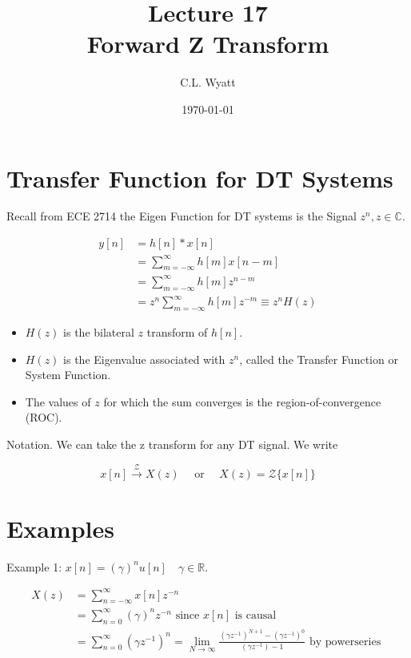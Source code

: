 \documentclass{article}
\begin{document}
\title{Lecture 17\\Forward Z Transform}
\author{C.L. Wyatt}
\date{\today}
\maketitle

\section{Transfer Function for DT Systems}

Recall from ECE 2714 the Eigen Function for DT systems is the Signal $z^{n}, z \in \mathbb{C}$.

$$
\begin{aligned}
y[n] &= h[n] * x[n]\\
& =\sum_{m=-\infty}^{\infty} h[m] x[n-m] \\
& =\sum_{m=-\infty}^{\infty} h[m] z^{n-m} \\
& =z^{n} \sum_{m=-\infty}^{\infty} h[m] z^{-m} \equiv z^{n} H(z)
\end{aligned}
$$

\begin{itemize}
  \item $H(z)$ is the bilateral $z$ transform of $h[n]$.
  \item $H(z)$ is the Eigenvalue associated with $z^{n}$, called the Transfer Function or System Function.
  \item The values of $z$ for which the sum converges is the region-of-convergence (ROC). 
\end{itemize}


Notation. We can take the z transform for any DT signal. We write

$$
x[n] \stackrel{\mathcal{Z}}{\longrightarrow} X(z) \quad\text{ or }\quad  X(z)=\mathcal{Z}\{x[n]\}
$$

\section{Examples}

Example 1: $x[n]=(\gamma)^{n} u[n] \quad \gamma \in \mathbb{R}$.


$$
\begin{aligned}
X(z) & =\sum_{n=-\infty}^{\infty} x[n] z^{-n} \\
& =\sum_{n=0}^{\infty}(\gamma)^{n} z^{-n} \text { since } x[n] \text { is causal} \\
& =\sum_{n=0}^{\infty}\left(\gamma z^{-1}\right)^{n}=\lim _{N \rightarrow \infty} \frac{\left(\gamma z^{-1}\right)^{N+1}-\left(\gamma z^{-1}\right)^{0}}{\left(\gamma z^{-1}\right)-1} \text { by powerseries } \end{aligned}
$$
\end{document}
